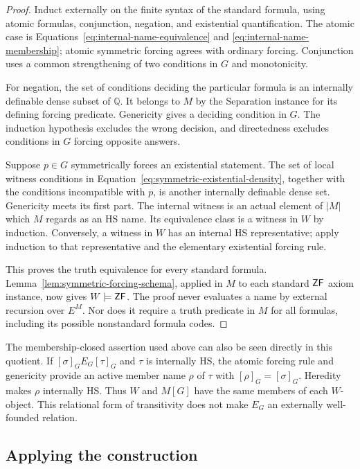 \begin{proof}
Induct externally on the finite syntax of the standard formula,
using atomic formulas, conjunction, negation, and existential
quantification. The atomic case is
Equations~\eqref{eq:internal-name-equivalence} and
\eqref{eq:internal-name-membership}; atomic symmetric forcing
agrees with ordinary forcing. Conjunction uses a common
strengthening of two conditions in $G$ and monotonicity.

For negation, the set of conditions deciding the particular
formula is an internally definable dense subset of $\mathbb Q$.
It belongs to $M$ by the Separation instance for its defining
forcing predicate. Genericity gives a deciding condition in $G$.
The induction hypothesis excludes the wrong decision, and
directedness excludes conditions in $G$ forcing opposite answers.

Suppose $p\in G$ symmetrically forces an existential statement.
The set of local witness conditions in
Equation~\eqref{eq:symmetric-existential-density}, together with
the conditions incompatible with $p$, is another internally
definable dense set. Genericity meets its first part. The internal
witness is an actual element of $|M|$ which $M$ regards as an HS
name. Its equivalence class is a witness in $W$ by induction.
Conversely, a witness in $W$ has an internal HS representative;
apply induction to that representative and the elementary
existential forcing rule.

This proves the truth equivalence for every standard formula.
Lemma~\ref{lem:symmetric-forcing-schema}, applied in $M$ to each
standard $\mathsf{ZF}$ axiom instance, now gives $W\models\mathsf{ZF}$.
The proof never evaluates a name by external recursion over
$E^M$. Nor does it require a truth predicate in $M$ for all
formulas, including its possible nonstandard formula codes.
\end{proof}

The membership-closed assertion used above can also be seen
directly in this quotient. If $[\sigma]_G E_G[\tau]_G$ and
$\tau$ is internally HS, the atomic forcing rule and genericity
provide an active member name $\rho$ of $\tau$ with
$[\rho]_G=[\sigma]_G$. Heredity makes $\rho$ internally HS.
Thus $W$ and $M[G]$ have the same members of each $W$-object.
This relational form of transitivity does not make $E_G$ an
externally well-founded relation.

\subsection{Applying the construction}

